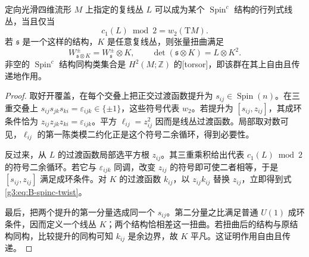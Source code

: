 \begin{proposition}\label{g3:prop:B-spinc-determinant}
 定向光滑四维流形 \(M\) 上指定的复线丛 \(L\) 可以成为某个
 \(\operatorname{Spin}^c\) 结构的行列式线丛，当且仅当
 \begin{equation}\label{g3:eq:B-spinc-characteristic}
 c_1(L)\bmod2=w_2(\mathrm TM).
 \end{equation}
 若 \(\mathfrak s\) 是一个这样的结构，\(K\) 是任意复线丛，则张量扭曲满足
 \begin{equation}\label{g3:eq:B-spinc-twist}
 W^\pm_{\mathfrak s\otimes K}=W^\pm_{\mathfrak s}\otimes K,
 \qquad
 \det(\mathfrak s\otimes K)=L\otimes K^2.
 \end{equation}
 非空的 \(\operatorname{Spin}^c\) 结构同构类集合是
 \(H^2(M;\mathbb Z)\) 的[torsor]，即该群在其上自由且传递地作用。
\end{proposition}
\begin{proof}
 取好开覆盖，在每个交叠上把正交过渡函数提升为 \(s_{ij}\in\operatorname{Spin}(n)\)。在三重交叠上
 \(s_{ij}s_{jk}s_{ki}=\varepsilon_{ijk}\in\{\pm1\}\)，这些符号代表 \(w_2\)。若提升为 \([s_{ij},z_{ij}]\)，其成环条件恰为
 \(z_{ij}z_{jk}z_{ki}=\varepsilon_{ijk}\)。平方 \(\ell_{ij}=z_{ij}^2\) 因而是线丛过渡函数。局部取对数可见，\(\ell_{ij}\) 的第一陈类模二约化正是这个符号二余循环，得到必要性。

 反过来，从 \(L\) 的过渡函数局部选平方根 \(z_{ij}\)。其三重乘积给出代表 \(c_1(L)\bmod2\) 的符号二余循环。若它与 \(\varepsilon_{ijk}\) 同调，改变 \(z_{ij}\) 的符号即可使二者相等，于是 \([s_{ij},z_{ij}]\) 满足成环条件。对 \(K\) 的过渡函数 \(k_{ij}\)，以 \(z_{ij}k_{ij}\) 替换 \(z_{ij}\)，立即得到式\eqref{g3:eq:B-spinc-twist}。

 最后，把两个提升的第一分量选成同一个 \(s_{ij}\)。第二分量之比满足普通 \(U(1)\) 成环条件，因而定义一个线丛 \(K\)；两个结构恰相差这一扭曲。若扭曲后的结构与原结构同构，比较提升的同构可知 \(k_{ij}\) 是余边界，故 \(K\) 平凡。这证明作用自由且传递。
\end{proof}

